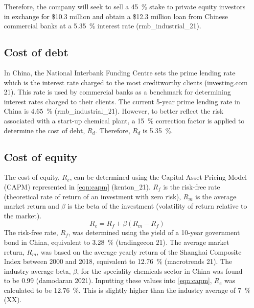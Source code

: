 Therefore, the company will seek to sell a \SI{45}{\percent} stake to private equity investors in exchange for \$10.3 million and obtain a \$12.3 million loan from Chinese commercial banks at a \SI{5.35}{\percent} interest rate (rmb_industrial_21).

\subsection{Cost of debt}
\label{sec:debt}
In China, the National Interbank Funding Centre sets the prime lending rate which is the interest rate charged to the most creditworthy clients (investing.com 21). This rate is used by commercial banks as a benchmark for determining interest rates charged to their clients. The current 5-year prime lending rate in China is \SI{4.65}{\percent} (rmb_industrial_21). However, to better reflect the risk associated with a start-up chemical plant, a \SI{15}{\percent} correction factor is applied to determine the cost of debt, $R_{d}$. Therefore, $R_{d}$ is \SI{5.35}{\percent}.

\subsection{Cost of equity}
\label{sec:equity}
The cost of equity, $R_{e}$, can be determined using the Capital Asset Pricing Model (CAPM) represented in \cref{eqn:capm} (kenton_21). $R_{f}$ is the risk-free rate (theoretical rate of return of an investment with zero risk), $R_{m}$ is the average market return and $\beta$ is the beta of the investment (volatility of return relative to the market).
\begin{equation}
\label{eqn:capm}
    R_{e}=R_{f}+\beta(R_{m}-R_{f})
\end{equation}
The risk-free rate, $R_{f}$, was determined using the yield of a 10-year government bond in China, equivalent to \SI{3.28}{\percent} (tradingecon 21). The average market return, $R_{m}$, was based on the average yearly return of the Shanghai Composite Index between 2000 and 2018, equivalent to \SI{12.76}{\percent} (macrotrends 21). The industry average beta, $\beta$, for the speciality chemicals sector in China was found to be 0.99 (damodaran 2021). Inputting these values into \cref{eqn:capm}, $R_{e}$ was calculated to be \SI{12.76}{\percent}. This is slightly higher than the industry average of \SI{7}{\percent} (XX).


